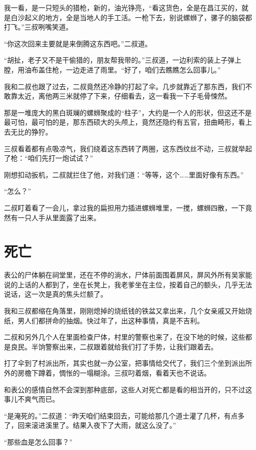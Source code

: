我一看，是一只短头的猎枪，新的，油光铮亮，“看这货色，全是在昌江买的，就是白沙起义的地方，全是当地人的手工活。一枪下去，别说螺蛳了，骡子的脑袋都打飞。”三叔咧嘴笑道。

“你这次回来主要就是来倒腾这东西吧。”二叔道。

“胡扯，老子又不是干偷猎的，朋友帮我带的。”三叔道，一边利索的装上子弹上膛，用油布盖住枪，一边走进了雨里。“好了，咱们去瞧瞧怎么回事儿。”

我和二叔也跟了过去，二叔竟然还冷静的打起了伞。几步就靠近了那东西，我们不敢靠太近，离他两三米就停了下来，仔细看去，这一看我一下子毛骨悚然。

那是一堆庞大的黑白斑斓的螺蛳聚成的“柱子”，大约是一个人的形状，但这还不是最可怕，最可怕的是，那东西硕大的头颅上，竟然还隐约有五官，扭曲畸形，看上去无比的狰狞。

三叔看着都有点吸凉气，我们绕着这东西转了两圈，这东西纹丝不动，三叔就举起了枪：“咱们先打一炮试试？”

刚想扣动扳机，二叔就拦住了他，对我们道：“等等，这个……里面好像有东西。”

“怎么？”

二叔盯着看了一会儿，拿过我的扁担用力插进螺蛳堆里，一搅，螺蛳四散，一下竟然有一只人手从里面露了出来。

\chapter{死亡}

表公的尸体躺在祠堂里，还在不停的淌水，尸体前面围着屏风，屏风外所有吴家能说的上话的人都到了，坐在长凳上，我老爹坐在主位，按着自己的额头，几乎无法说话，这一次是真的焦头烂额了。

我和三叔都缩在角落里，刚刚熄掉的烧纸钱的铁盆又拿出来，几个女亲戚又开始烧纸，男人们都拼命的抽烟。快过年了，出这种事情，真是不吉利。

二叔和另外几个人在里面检查尸体，村里的警察也来了，在没下地的时候，这些都是良民。半饷警察出来，二叔跟着就给我们打了手势，让我们跟着去。

打了伞到了村派出所，其实也就一办公室，把事情给交代了，我们三个坐到派出所外的房檐下蹲着，惆怅的一塌糊涂。三叔叼着烟，看着天也不说话。

和表公的感情自然不会深到那种底部，这些人对死亡都是看的相当开的，只不过这事儿不爽气而已。

“是淹死的。”二叔道：“昨天咱们结束回去，可能给那几个道士灌了几杯，有点多了，回来滚进溪里了。结果入夜下了大雨，就这么没了。”

“那些血是怎么回事？”

